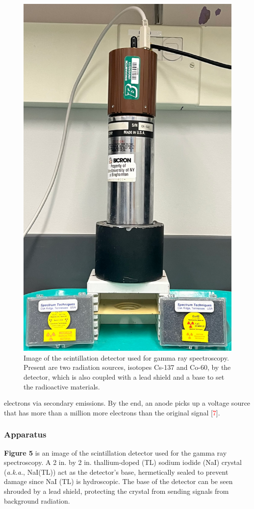 \documentclass[12pt]{article}
\begin{document}
\begin{multicols}{2}
\begin{figure}[H]
    \includegraphics[width=0.98\linewidth]{figs/fig5.png}
    \caption{
        Image of the scintillation detector used for 
        gamma ray spectroscopy. Present are two radiation 
        sources, isotopes Cs-137 and Co-60, by the detector, 
        which is also coupled with a lead shield and a base to set 
        the radioactive materials. 
    }
\end{figure}
\noindent
electrons via secondary emissions. By 
the end, an anode picks up a voltage source that has 
more than a million more electrons than the original 
signal [\textcolor{red}{7}]. 

\subsubsection{Apparatus}
\textbf{Figure 5} is an image of the scintillation 
detector used for the gamma ray spectroscopy. A 2 in.
by 2 in. thallium-doped (TL) sodium iodide (NaI) crystal
(\textit{a.k.a.}, NaI(TL)) act as the detector's base,
hermetically sealed to prevent damage since  NaI (TL) is
hydroscopic. The base of the detector can be seen shrouded
by a lead shield, protecting the crystal from sending signals
from background radiation. 


\end{multicols}
\end{document}
